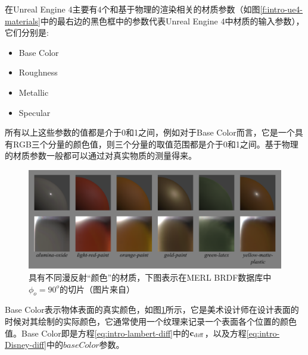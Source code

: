在Unreal Engine 4主要有4个和基于物理的渲染相关的材质参数（如图\ref{f:intro-ue4-materials}中的最右边的黑色框中的参数代表Unreal Engine 4中材质的输入参数），它们分别是:

\begin{itemize}
	\item Base Color
	\item Roughness
	\item Metallic
	\item Specular
\end{itemize}

所有以上这些参数的值都是介于0和1之间，例如对于Base Color而言，它是一个具有RGB三个分量的颜色值，则三个分量的取值范围都是介于0和1之间。基于物理的材质参数一般都可以通过对真实物质的测量得来。

\begin{figure}
\begin{fullwidth}
	\includegraphics[width=\thewidth]{figures/intro/diffusebands}
	\caption{具有不同漫反射“颜色”的材质，下图表示在MERL BRDF数据库中$\phi_o=90^o$的切片（图片来自\cite{a:PhysicallyBasedShadingatDisney}）}
	\label{f:intro-basecolor}
\end{fullwidth}
\end{figure}

Base Color表示物体表面的真实颜色，如图\ref{f:intro-basecolor}所示，它是美术设计师在设计表面的时候对其绘制的实际颜色，它通常使用一个纹理来记录一个表面各个位置的颜色值。Base Color即是方程\ref{eq:intro-lambert-diff}中的$\mathbf{c}_{\rm diff}$，以及方程\ref{eq:intro-Disney-diff}中的$baseColor$参数。

